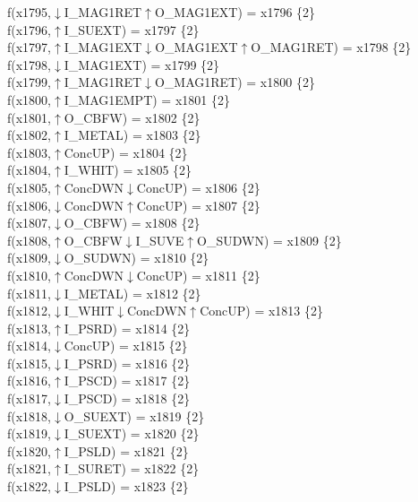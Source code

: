 f(x1795,$\downarrow$I\_MAG1RET$\uparrow$O\_MAG1EXT) = x1796 \{2\} \\  
f(x1796,$\uparrow$I\_SUEXT) = x1797 \{2\} \\  
f(x1797,$\uparrow$I\_MAG1EXT$\downarrow$O\_MAG1EXT$\uparrow$O\_MAG1RET) = x1798 \{2\} \\  
f(x1798,$\downarrow$I\_MAG1EXT) = x1799 \{2\} \\  
f(x1799,$\uparrow$I\_MAG1RET$\downarrow$O\_MAG1RET) = x1800 \{2\} \\  
f(x1800,$\uparrow$I\_MAG1EMPT) = x1801 \{2\} \\  
f(x1801,$\uparrow$O\_CBFW) = x1802 \{2\} \\  
f(x1802,$\uparrow$I\_METAL) = x1803 \{2\} \\  
f(x1803,$\uparrow$ConcUP) = x1804 \{2\} \\  
f(x1804,$\uparrow$I\_WHIT) = x1805 \{2\} \\  
f(x1805,$\uparrow$ConcDWN$\downarrow$ConcUP) = x1806 \{2\} \\  
f(x1806,$\downarrow$ConcDWN$\uparrow$ConcUP) = x1807 \{2\} \\  
f(x1807,$\downarrow$O\_CBFW) = x1808 \{2\} \\  
f(x1808,$\uparrow$O\_CBFW$\downarrow$I\_SUVE$\uparrow$O\_SUDWN) = x1809 \{2\} \\  
f(x1809,$\downarrow$O\_SUDWN) = x1810 \{2\} \\  
f(x1810,$\uparrow$ConcDWN$\downarrow$ConcUP) = x1811 \{2\} \\  
f(x1811,$\downarrow$I\_METAL) = x1812 \{2\} \\  
f(x1812,$\downarrow$I\_WHIT$\downarrow$ConcDWN$\uparrow$ConcUP) = x1813 \{2\} \\  
f(x1813,$\uparrow$I\_PSRD) = x1814 \{2\} \\  
f(x1814,$\downarrow$ConcUP) = x1815 \{2\} \\  
f(x1815,$\downarrow$I\_PSRD) = x1816 \{2\} \\  
f(x1816,$\uparrow$I\_PSCD) = x1817 \{2\} \\  
f(x1817,$\downarrow$I\_PSCD) = x1818 \{2\} \\  
f(x1818,$\downarrow$O\_SUEXT) = x1819 \{2\} \\  
f(x1819,$\downarrow$I\_SUEXT) = x1820 \{2\} \\  
f(x1820,$\uparrow$I\_PSLD) = x1821 \{2\} \\  
f(x1821,$\uparrow$I\_SURET) = x1822 \{2\} \\  
f(x1822,$\downarrow$I\_PSLD) = x1823 \{2\} \\  
